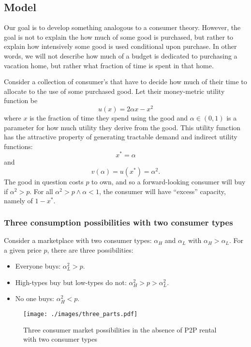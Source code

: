 \documentclass[11pt]{article}
\begin{document}
\subsection{Model} 
Our goal is to develop something analogous to a consumer theory. 
However, the goal is not to explain the how much of some good is purchased, but rather to explain how intensively some good is used conditional upon purchase. 
In other words, we will not describe how much of a budget is dedicated to purchasing a vacation home, but rather what fraction of time is spent in that home. 

Consider a collection of consumer's that have to decide how much of their time to allocate to the use of some purchased good. 
Let their money-metric utility function be
\begin{equation}
u(x) = 2 \alpha x - x^2  
\end{equation} 
where $x$ is the fraction of time they spend using the good and $\alpha \in (0,1)$ is a parameter for how much utility they derive from the good. 
This utility function has the attractive property of generating tractable demand and indirect utility functions: 
\begin{equation}
x^* = \alpha  
\end{equation} 
and 
\begin{equation}
v(\alpha) = u(x^*) = \alpha^2.  
\end{equation} 
The good in question costs $p$ to own, and so a forward-looking consumer will buy if $\alpha^2 > p$. 
For all $\alpha^2 > p \wedge \alpha < 1$, the consumer will have ``excess'' capacity, namely of $1 - x^*$.

\subsubsection{Three consumption possibilities with two consumer types} 
Consider a marketplace with two consumer types: $\alpha_H$ and $\alpha_L$ with $\alpha_H > \alpha_L$. 
For a given price $p$, there are three possibilities: 
\begin{itemize}
\item Everyone buys: $\alpha_L^2 > p$. 
\item High-types buy but low-types do not: $\alpha_H^2 > p > \alpha_L^2$. 
\item No one buys: $\alpha_H^2 < p$. 
\end{itemize} 

\begin{figure}
\centering 
\caption{Three consumer market possibilities in the absence of P2P rental with two consumer types}
\begin{minipage}{0.8 \textwidth} 
\texttt{[image: ./images/three\_parts.pdf]} 
\end{minipage}  
\end{figure} 
\end{document}

